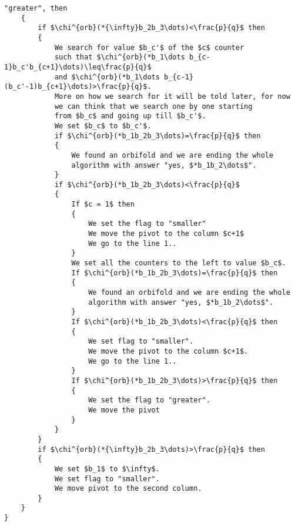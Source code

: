 \begin{lstlisting}[firstnumber=1,consecutivenumbers=true]
    "greater", then
    {
        if $\chi^{orb}(*{\infty}b_2b_3\dots)<\frac{p}{q}$ then
        {
            We search for value $b_c'$ of the $c$ counter 
            such that $\chi^{orb}(*b_1\dots b_{c-1}b_c'b_{c+1}\dots)\leq\frac{p}{q}$ 
            and $\chi^{orb}(*b_1\dots b_{c-1}(b_c'-1)b_{c+1}\dots)>\frac{p}{q}$.
            More on how we search for it will be told later, for now  
            we can think that we search one by one starting 
            from $b_c$ and going up till $b_c'$.
            We set $b_c$ to $b_c'$.
            if $\chi^{orb}(*b_1b_2b_3\dots)=\frac{p}{q}$ then 
            {
                We found an orbifold and we are ending the whole
                algorithm with answer "yes, $*b_1b_2\dots$".
            }
            if $\chi^{orb}(*b_1b_2b_3\dots)<\frac{p}{q}$
            {
                If $c = 1$ then
                {
                    We set the flag to "smaller"
                    We move the pivot to the column $c+1$
                    We go to the line 1..
                }
                We set all the counters to the left to value $b_c$.
                If $\chi^{orb}(*b_1b_2b_3\dots)=\frac{p}{q}$ then 
                {
                    We found an orbifold and we are ending the whole
                    algorithm with answer "yes, $*b_1b_2\dots$".
                }
                If $\chi^{orb}(*b_1b_2b_3\dots)<\frac{p}{q}$ then 
                {
                    We set flag to "smaller".
                    We move the pivot to the column $c+1$.
                    We go to the line 1..
                }
                If $\chi^{orb}(*b_1b_2b_3\dots)>\frac{p}{q}$ then 
                {
                    We set the flag to "greater".
                    We move the pivot 
                }
            }
        }
        if $\chi^{orb}(*{\infty}b_2b_3\dots)>\frac{p}{q}$ then
        {
            We set $b_1$ to $\infty$.
            We set flag to "smaller".
            We move pivot to the second column.
        }    
    }
}
\end{lstlisting}

